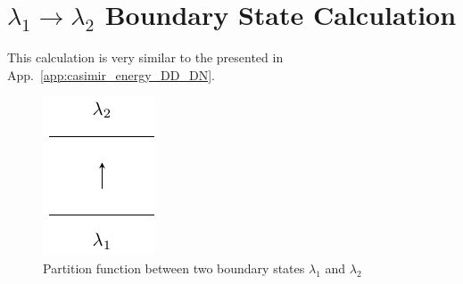\documentclass{article}
\begin{document}
\section{$\lambda_1 \rightarrow \lambda_2$ Boundary State Calculation}
\label{app:lambda_12}

This calculation is very similar to the presented in App.~\ref{app:casimir_energy_DD_DN}. 

\begin{figure}[h]
\centering
\includegraphics[width=	extwidth]{fig_part-lambda1-lambda2-2}\caption{Partition function between two boundary states $\lambda_1$ and $\lambda_2$}
\label{fig:part-lambda1-lambda2-2}
\end{figure}
\end{document}
